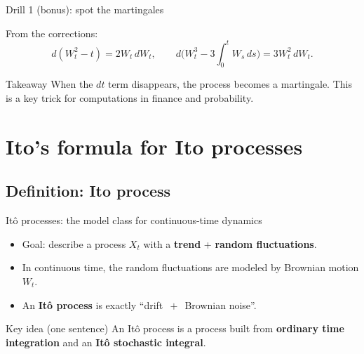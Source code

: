 \documentclass[10pt,aspectratio=169]{beamer}
\begin{document}
\begin{frame}{Drill 1 (bonus): spot the martingales}

From the corrections:\pause
\[
d(W_t^2-t)=2W_t\,dW_t,
\qquad
d\Big(W_t^3-3\int_0^t W_s\,ds\Big)=3W_t^2\,dW_t.
\]\pause

\begin{block}{Takeaway}
When the $dt$ term disappears, the process becomes a martingale.
This is a key trick for computations in finance and probability.
\end{block}

\end{frame}

\section{Ito's formula for Ito processes}

\subsection{Definition: Ito process}

\begin{frame}{It\^o processes: the model class for continuous-time dynamics}

\begin{itemize}
  \item Goal: describe a process $X_t$ with a \textbf{trend} + \textbf{random fluctuations}.\pause
  \item In continuous time, the random fluctuations are modeled by Brownian motion $W_t$.\pause
  \item An \textbf{It\^o process} is exactly ``drift $\,+\,$ Brownian noise''.\pause
\end{itemize}

\medskip
\begin{alertblock}{Key idea (one sentence)}
An It\^o process is a process built from \textbf{ordinary time integration} and an \textbf{It\^o stochastic integral}.
\end{alertblock}

\end{frame}
\end{document}
